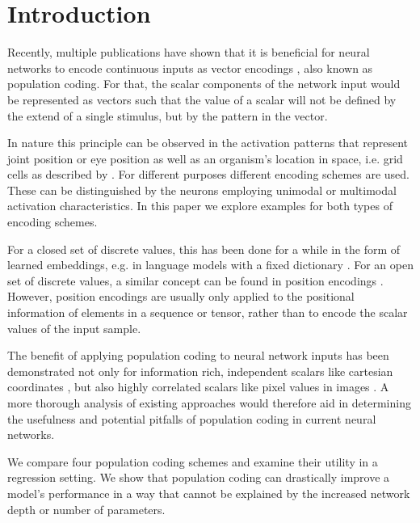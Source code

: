 \section{Introduction}

Recently, multiple publications have shown that it is beneficial for neural networks to encode continuous inputs
as vector encodings \cite{mildenhall2020nerf}\cite{jahrens2020solving}, also known as population coding. 
For that, the scalar components of the network input would be represented as vectors such that the value of a scalar will not be defined by the extend of a single stimulus, but by the pattern in the vector.

In nature this principle can be observed in the activation patterns that represent joint position or eye position as well as an organism's location in space, i.e. grid cells as described by \cite{haftin2005gridcells}. For different purposes different encoding schemes are used. These can be distinguished by the neurons employing unimodal or multimodal activation characteristics. In this paper we explore examples for both types of encoding schemes. 

For a closed set of discrete values, this has been done for a while in the form of learned embeddings, e.g. in language models with a fixed dictionary \cite{devlin2019bert}.
For an open set of discrete values, a similar concept can be found in position encodings \cite{vaswani2017transformer}. 
However, position encodings are usually only applied to the positional information of elements in a sequence or tensor, rather than to encode the scalar values of the input sample.

The benefit of applying population coding to neural network inputs has been demonstrated not only for information rich, independent scalars like cartesian coordinates \cite{mildenhall2020nerf}, 
but also highly correlated scalars like pixel values in images \cite{jahrens2020solving}. 
A more thorough analysis of existing approaches would therefore aid in determining the usefulness and potential pitfalls of population coding in current neural networks.

We compare four population coding schemes and examine their utility in a regression setting. 
We show that population coding can drastically improve a model's performance in a way that cannot be explained by the increased network depth or number of parameters.